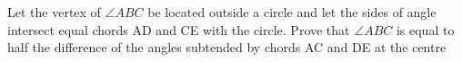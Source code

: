 Let the vertex of $\angle ABC$ be located outside a circle and let the sides of angle intersect equal chords AD and CE with the circle.
\newline
Prove that $\angle ABC$ is equal to half the difference of the angles subtended by chords AC and DE at the centre
